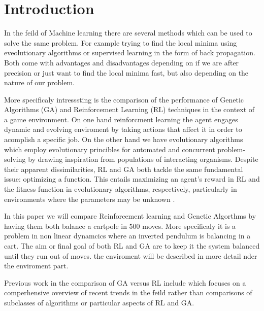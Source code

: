 \section{Introduction}



In the feild of Machine learning there are several methods which can be used to solve the same problem. For example trying to find the local minima using eveolutionary algorithms or supervised learning in the form of back propagation. Both come with advantages and disadvantages depending on if we are after precision or just want to find the local minima fast, but also depending on the nature of our problem.

More specificaly intresssting is the comparison of the performance of Genetic Algorithms (GA) and Reinforcement Learning (RL) techniques in the context of a game environment. On one hand reinforcment learning the agent engages dynamic and evolving enviroment by taking actions that affect it in order to acomplish a specific job. On the other hand we have evolutionary algorithms which employ evolutionary princibles for automated and concurrent problem-solving by drawing inspiration from populations of interacting organisms. Despite their apparent dissimilarities, RL and GA both tackle the same fundamental issue: optimizing a function. This entails maximizing an agent's reward in RL and the fitness function in evolutionary algorithms, respectively, particularly in environments where the parameters may be unknown \cite{drugan2019reinforcement}. 

In this paper we will compare Reinforcement learning and Genetic Algorthms by having them both balance a cartpole in 500 moves. More specificaly it is a problem in non linear dynamcics where an inverted pendulum is balancing in a cart. The aim or final goal of both RL and GA are to keep it the system balanced until they run out of moves. the enviroment will be described in more detail nder the enviroment part.  

Previous work in the comparison of GA versus RL include \cite{drugan2019reinforcement} which focuses on a comperhensive overview of recent trends in the feild rather than comparisons of subclasses of algorithms or particular aspects of RL and GA.



